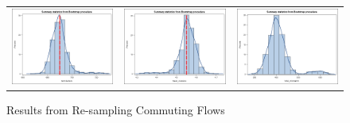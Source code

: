 \begin{figure}
\caption{Results from Re-sampling Commuting Flows  \label{fig:sensitivity}}
\begin{tabular}{ccc}
\includegraphics[scale=.3]{./figures/numclusters_jtw1990_moe.png}& 
\includegraphics[scale=.3]{./figures/mean_clussize_jtw1990_moe.png}&
\includegraphics[scale=.3]{./figures/mismatchedcounties_jtw1990_moe.png} \\ 

\end{tabular}
\end{figure}
